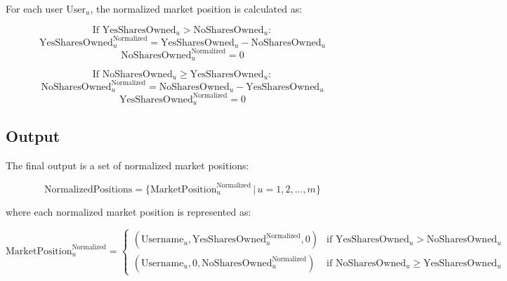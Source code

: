 \documentclass{article}
\begin{document}
For each user \(\text{User}_u\), the normalized market position is calculated as:

\[
\text{If } \text{YesSharesOwned}_u > \text{NoSharesOwned}_u:
\]
\[
\text{YesSharesOwned}_u^\text{Normalized} = \text{YesSharesOwned}_u - \text{NoSharesOwned}_u
\]
\[
\text{NoSharesOwned}_u^\text{Normalized} = 0
\]

\[
\text{If } \text{NoSharesOwned}_u \geq \text{YesSharesOwned}_u:
\]
\[
\text{NoSharesOwned}_u^\text{Normalized} = \text{NoSharesOwned}_u - \text{YesSharesOwned}_u
\]
\[
\text{YesSharesOwned}_u^\text{Normalized} = 0
\]

\subsection*{Output}

The final output is a set of normalized market positions:

\[
\text{NormalizedPositions} = \{ \text{MarketPosition}_u^\text{Normalized} \,|\, u = 1, 2, \dots, m \}
\]

where each normalized market position is represented as:

\[
\text{MarketPosition}_u^\text{Normalized} =
\begin{cases}
(\text{Username}_u, \text{YesSharesOwned}_u^\text{Normalized}, 0) & \text{if } \text{YesSharesOwned}_u > \text{NoSharesOwned}_u \\
(\text{Username}_u, 0, \text{NoSharesOwned}_u^\text{Normalized}) & \text{if } \text{NoSharesOwned}_u \geq \text{YesSharesOwned}_u
\end{cases}
\]


\begin{center}
\end{center}
\end{document}
